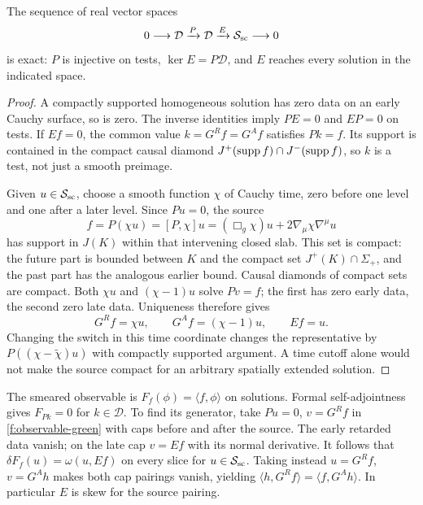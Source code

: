 \begin{theorem}\label{f:source-exact}
The sequence of real vector spaces
\[
 0\longrightarrow\mathcal D\xrightarrow{P}\mathcal D
       \xrightarrow{E}\mathcal S_{\rm sc}\longrightarrow0
\]
is exact: $P$ is injective on tests, $\ker E=P\mathcal D$, and $E$ reaches every solution in the indicated space.
\end{theorem}
\begin{proof}
A compactly supported homogeneous solution has zero data on an early Cauchy surface, so is zero. The inverse identities imply $PE=0$ and $EP=0$ on tests. If $Ef=0$, the common value $k=G^R f=G^A f$ satisfies $Pk=f$. Its support is contained in the compact causal diamond $J^+(\operatorname{supp} f)\cap J^-(\operatorname{supp} f)$, so $k$ is a test, not just a smooth preimage.

Given $u\in\mathcal S_{\rm sc}$, choose a smooth function $\chi$ of Cauchy time, zero before one level and one after a later level. Since $Pu=0$, the source
\[
 f=P(\chi u)=[P,\chi]u=(\Box_g\chi)u+2\nabla_\mu\chi\nabla^\mu u
\]
has support in $J(K)$ within that intervening closed slab. This set is compact: the future part is bounded between $K$ and the compact set $J^+(K)\cap\Sigma_+$, and the past part has the analogous earlier bound. Causal diamonds of compact sets are compact. Both $\chi u$ and $(\chi-1)u$ solve $Pv=f$; the first has zero early data, the second zero late data. Uniqueness therefore gives
\[
 G^R f=\chi u,\qquad G^A f=(\chi-1)u,\qquad Ef=u.
\]
Changing the switch in this time coordinate changes the representative by $P((\chi-\widetilde\chi)u)$ with compactly supported argument. A time cutoff alone would not make the source compact for an arbitrary spatially extended solution.
\end{proof}

The smeared observable is $F_f(\phi)=\langle f,\phi\rangle$ on solutions. Formal self-adjointness gives $F_{Pk}=0$ for $k\in\mathcal D$. To find its generator, take $Pu=0$, $v=G^R f$ in \eqref{f:observable-green} with caps before and after the source. The early retarded data vanish; on the late cap $v=Ef$ with its normal derivative. It follows that $\delta F_f(u)=\omega(u,Ef)$ on every slice for $u\in\mathcal S_{\rm sc}$. Taking instead $u=G^R f$, $v=G^A h$ makes both cap pairings vanish, yielding $\langle h,G^R f\rangle=\langle f,G^A h\rangle$. In particular $E$ is skew for the source pairing.

